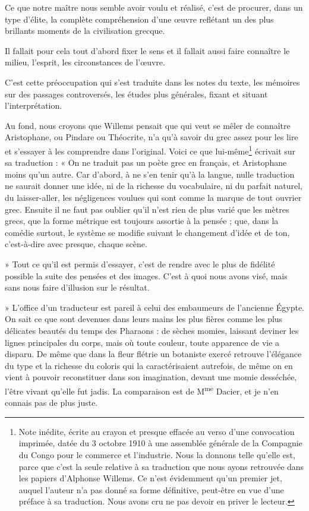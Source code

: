 \documentclass{book}%
\newcommand{\expo}[1]{\textsuperscript{#1}}%
\newcommand{\note}[1]{\footnote{#1}}
\begin{document}
Ce que notre maître nous semble avoir voulu et réalisé, c'est de procurer, dans un type d'élite, la complète compréhension d'une œuvre reflétant un des plus brillants moments de la civilisation grecque. 

Il fallait pour cela tout d'abord fixer le sens et il fallait aussi faire connaître le milieu, l'esprit, les circonstances de l'œuvre. 

C'est cette préoccupation qui s'est traduite dans les notes du texte, les mémoires sur des passages controversés, les études plus générales, fixant et situant l'interprétation. 

Au fond, nous croyons que Willems pensait que qui veut se mêler de connaître Aristophane, ou Pindare ou Théocrite, n'a qu'à savoir du grec assez pour les lire et s'essayer à les comprendre dans l'original. Voici ce que lui-même\note{Note inédite, écrite au crayon et presque effacée au verso d'une convocation imprimée, datée du 3 octobre 1910 à une assemblée générale de la Compagnie du Congo pour le commerce et l'industrie. Nous la donnons telle qu'elle est, parce que c'est la seule relative à sa traduction que nous ayons retrouvée dans les papiers d'Alphonse Willems. Ce n'est évidemment qu'un premier jet, auquel l'auteur n'a pas donné sa forme définitive, peut-être en vue d'une préface à sa traduction. Nous avons cru ne pas devoir en priver le lecteur.} écrivait sur sa traduction : « On ne traduit pas un poète grec en français, et Aristophane moins qu'un autre. Car d'abord, à ne s'en tenir qu'à la langue, nulle traduction ne saurait donner une idée, ni de la richesse du vocabulaire, ni du parfait naturel, du laisser-aller, les négligences voulues qui sont comme la marque de tout ouvrier grec. Ensuite il ne faut pas oublier qu'il n'est rien de plus varié que les mètres grecs, que la forme métrique est toujours assortie à la pensée ; que, dans la comédie surtout, le système se modifie suivant le changement d'idée et de ton, c'est-à-dire avec presque, chaque scène.  

» Tout ce qu'il est permis d'essayer, c'est de rendre avec le plus de fidélité possible la suite des pensées et des images. C'est à quoi nous avons visé, mais sans nous faire d'illusion sur le résultat.

» L'office d'un traducteur est pareil à celui des embaumeurs de l'ancienne Égypte. On sait ce que sont devenues dans leurs mains les plus fières comme les plus délicates beautés du temps des Pharaons : de sèches momies, laissant deviner les lignes principales du corps, mais où toute couleur, toute apparence de vie a disparu. De même que dans la fleur flétrie un botaniste exercé retrouve l'élégance du type et la richesse du coloris qui la caractérisaient autrefois, de même on en vient à pouvoir reconstituer dans son imagination, devant une momie desséchée, l'être vivant qu'elle fut jadis. La comparaison est de M\expo{me} Dacier, et je n'en connais pas de plus juste. 
\end{document}

